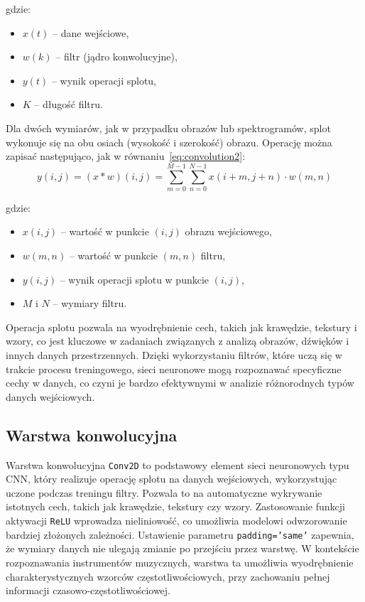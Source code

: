 \documentclass{SGGW-thesis}
\begin{document}
gdzie:
\begin{itemize}
    \renewcommand{\labelitemi}{}
    \item \( x(t) \) – dane wejściowe,
    \item \( w(k) \) – filtr (jądro konwolucyjne),
    \item \( y(t) \) – wynik operacji splotu,
    \item \( K \) – długość filtru.
\end{itemize}

Dla dwóch wymiarów, jak w przypadku obrazów lub spektrogramów, splot wykonuje się na obu osiach (wysokość i szerokość) obrazu. Operację można zapisać następująco, jak w równaniu~\ref{eq:convolution2}:
\begin{equation}
y(i,j) = (x * w)(i,j) = \sum_{m=0}^{M-1} \sum_{n=0}^{N-1} x(i+m, j+n) \cdot w(m,n)
\label{eq:convolution2}
\end{equation}

gdzie:
\begin{itemize}
    \renewcommand{\labelitemi}{}
    \item \( x(i,j) \) – wartość w punkcie \((i,j)\) obrazu wejściowego,
    \item \( w(m,n) \) – wartość w punkcie \((m,n)\) filtru,
    \item \( y(i,j) \) – wynik operacji splotu w punkcie \((i,j)\),
    \item \( M \) i \( N \) – wymiary filtru.
\end{itemize}

Operacja splotu pozwala na wyodrębnienie cech, takich jak krawędzie, tekstury i wzory, co jest kluczowe w zadaniach związanych z analizą obrazów, dźwięków i innych danych przestrzennych. Dzięki wykorzystaniu filtrów, które uczą się w trakcie procesu treningowego, sieci neuronowe mogą rozpoznawać specyficzne cechy w danych, co czyni je bardzo efektywnymi w analizie różnorodnych typów danych wejściowych.

\subsection{Warstwa konwolucyjna}
Warstwa konwolucyjna \texttt{Conv2D} to podstawowy element sieci neuronowych typu CNN, który realizuje operację splotu na danych wejściowych, wykorzystując uczone podczas treningu filtry. Pozwala to na automatyczne wykrywanie istotnych cech, takich jak krawędzie, tekstury czy wzory. Zastosowanie funkcji aktywacji \texttt{ReLU} wprowadza nieliniowość, co umożliwia modelowi odwzorowanie bardziej złożonych zależności. Ustawienie parametru \texttt{padding='same'} zapewnia, że wymiary danych nie ulegają zmianie po przejściu przez warstwę. W kontekście rozpoznawania instrumentów muzycznych, warstwa ta umożliwia wyodrębnienie charakterystycznych wzorców częstotliwościowych, przy zachowaniu pełnej informacji czasowo-częstotliwościowej.
\end{document}
